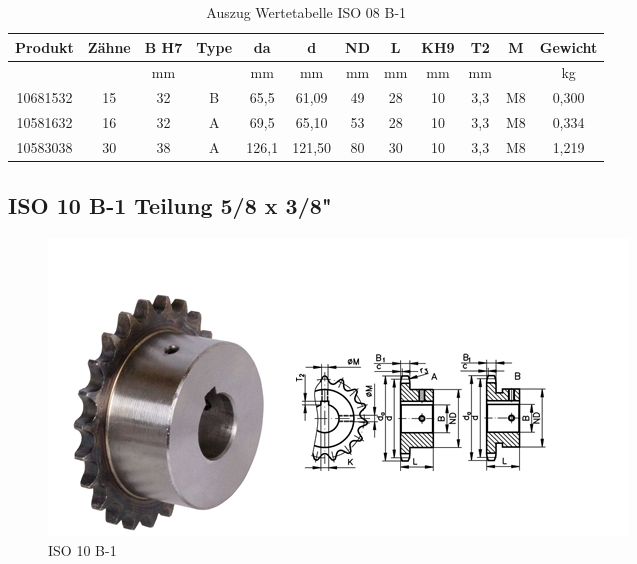 \begin{table}[H]
	\begin{tabular}{|c|c|c|c|c|c|c|c|c|c|c|c|}
	\hline
		\textbf{Produkt} & \textbf{Zähne} & \textbf{B H7} & \textbf{Type} & \textbf{da} & \textbf{d} & \textbf{ND} & \textbf{L} & \textbf{KH9} & \textbf{T2} & \textbf{M} & \textbf{Gewicht} \\ \hline
		                 & \textbf{}                 & mm                           &               & mm          & mm         & mm          & mm         & mm           & mm          &            & kg               \\ \hline
		10681532         & 15                        & 32                           & B             & 65,5        & 61,09      & 49          & 28         & 10           & 3,3         & M8         & 0,300            \\ \hline
		10581632         & 16                        & 32                           & A             & 69,5        & 65,10      & 53          & 28         & 10           & 3,3         & M8         & 0,334            \\ \hline
		10583038         & 30                        & 38                           & A             & 126,1       & 121,50     & 80          & 30         & 10           & 3,3         & M8         & 1,219            \\ \hline
	\end{tabular}
	\caption{Auszug Wertetabelle ISO 08 B-1}
\end{table}

\newpage

\subsection*{ISO 10 B-1 Teilung 5/8 x 3/8"}

\begin{figure} [H]
	\begin{center}
		\includegraphics[scale=0.7]{figures/mechanik/ISO 10 B-1 .PNG}
			\caption{ISO 10 B-1}
			\label{fig:ISO 10 B-1}
	\end{center}
\end{figure}

